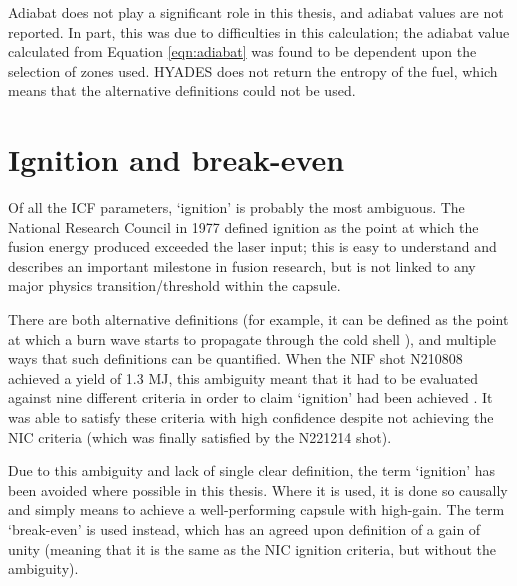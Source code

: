 Adiabat does not play a significant role in this thesis, and adiabat values are not reported. In part, this was due to difficulties in this calculation; the adiabat value calculated from Equation \ref{eqn:adiabat} was found to be dependent upon the selection of zones used. HYADES does not return the entropy of the fuel, which means that the alternative definitions could not be used.


\section{Ignition and break-even}
Of all the ICF parameters, `ignition' is probably the most ambiguous. The National Research Council in 1977 defined ignition as the point at which the fusion energy produced exceeded the laser input; this is easy to understand and describes an important milestone in fusion research, but is not linked to any major physics transition/threshold within the capsule.

There are both alternative definitions (for example, it can be defined as the point at which a burn wave starts to propagate through the cold shell \cite{Christopherson2020}), and multiple ways that such definitions can be quantified. When the NIF shot N210808 achieved a yield of 1.3 MJ, this ambiguity meant that it had to be evaluated against nine different criteria in order to claim `ignition' had been achieved \cite{Abu-Shawareb2022}. It was able to satisfy these criteria with high confidence despite not achieving the NIC criteria (which was finally satisfied by the N221214 shot).

Due to this ambiguity and lack of single clear definition, the term `ignition' has been avoided where possible in this thesis. Where it is used, it is done so causally and simply means to achieve a well-performing capsule with high-gain. The term `break-even' is used instead, which has an agreed upon definition of a gain of unity (meaning that it is the same as the NIC ignition criteria, but without the ambiguity).